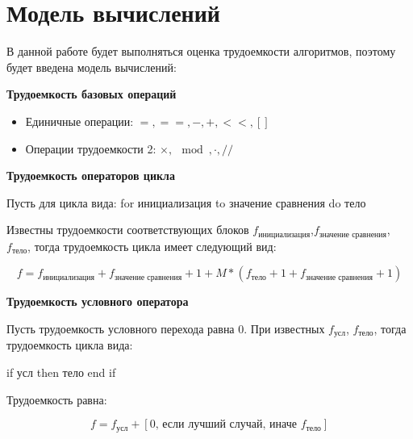 
\section{Модель вычислений}

В данной работе будет выполняться оценка трудоемкости алгоритмов, поэтому будет введена модель вычислений:

\textbf{Трудоемкость базовых операций}

\begin{itemize}
    \item Единичные операции: $=, ==, -, +, <<, []$
    \item Операции трудоемкости 2: $\times, \mod, \cdot, //$
\end{itemize}

\textbf{Трудоемкость операторов цикла}

Пусть для цикла вида:
for инициализация to значение сравнения do тело
    
Известны трудоемкости соответствующих блоков $f_{\text{инициализация}}$,\newline$f_{\text{значение сравнения}}$, $f_{\text{тело}}$, тогда трудоемкость цикла имеет следующий вид:

\begin{equation}
    \label{eq:work1}
    f = f_{\text{инициализация}} + f_{\text{значение сравнения}} + 1 + M*(f_{\text{тело}} + 1 + f_{\text{значение сравнения}} + 1)
\end{equation}

\textbf{Трудоемкость условного оператора}

Пусть трудоемкость условного перехода равна 0. При известных $f_\text{усл}$, $f_{\text{тело}}$, тогда трудоемкость цикла вида:

if усл then тело end if

Трудоемкость равна:

\begin{equation}
    \label{eq:work2}
    f = f_{\text{усл}} + [0\text{, если лучший случай, иначе } f_{\text{тело}}]
\end{equation}

